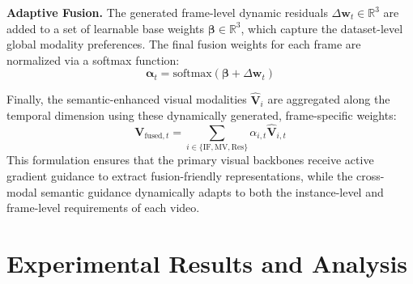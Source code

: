 \documentclass[runningheads]{llncs}
\begin{document}
\noindent\textbf{Adaptive Fusion.} 
The generated frame-level dynamic residuals $\Delta \mathbf{w}_t \in \mathbb{R}^3$ are added to a set of learnable base weights $\boldsymbol{\beta} \in \mathbb{R}^3$, which capture the dataset-level global modality preferences. The final fusion weights for each frame are normalized via a softmax function:
$$\boldsymbol{\alpha}_t = \text{softmax}(\boldsymbol{\beta} + \Delta \mathbf{w}_t)$$



Finally, the semantic-enhanced visual modalities $\hat{\mathbf{V}}_i$ are aggregated along the temporal dimension using these dynamically generated, frame-specific weights:
$$\mathbf{V}_{\text{fused}, t} = \sum_{i \in \{\text{IF}, \text{MV}, \text{Res}\}} \alpha_{i, t} \hat{\mathbf{V}}_{i, t}$$
This formulation ensures that the primary visual backbones receive active gradient guidance to extract fusion-friendly representations, while the cross-modal semantic guidance dynamically adapts to both the instance-level and frame-level requirements of each video.



\section{Experimental Results and Analysis}
\label{sec:experiments} %
\end{document}
